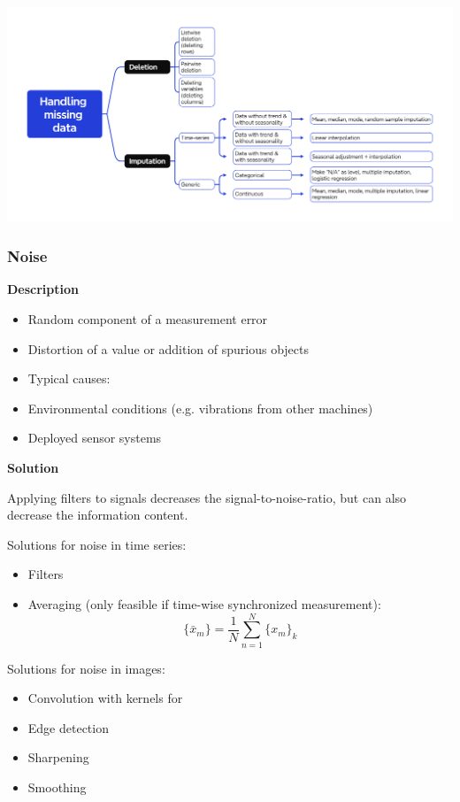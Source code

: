 \documentclass[12pt, a4paper, oneside, justified]{article}
\begin{document}
\begin{center}
\includegraphics[width=1\textwidth]{../img/3-15.png}
\end{center}

\subsubsection{Noise}

\textbf{Description}
\begin{itemize}
    \item Random component of a measurement error
    \item Distortion of a value or addition of spurious objects
    \item Typical causes:
    \item Environmental conditions (e.g. vibrations from other machines)
    \item Deployed sensor systems
\end{itemize}

\textbf{Solution}

Applying filters to signals decreases the signal-to-noise-ratio, but can also decrease the information content.

Solutions for noise in time series:
\begin{itemize}
    \item Filters
    \item Averaging (only feasible if time-wise synchronized measurement): 
    $$
    \{ \bar{x}_m \} = \frac{1}{N} \sum _{n=1}^N\{x_m\} _k
    $$
\end{itemize}

Solutions for noise in images:
\begin{itemize}
    \item Convolution with kernels for
    \item Edge detection
    \item Sharpening
    \item Smoothing
\end{itemize}
\end{document}
